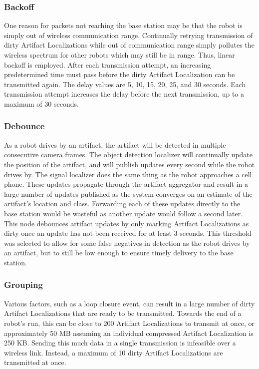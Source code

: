 \subsubsection{Backoff}
One reason for packets not reaching the base station may be that the robot is simply out of wireless communication range. Continually retrying transmission of dirty Artifact Localizations while out of communication range simply pollutes the wireless spectrum for other robots which may still be in range. Thus, linear backoff is employed. After each transmission attempt, an increasing predetermined time must pass before the dirty Artifact Localization can be transmitted again. The delay values are 5, 10, 15, 20, 25, and 30 seconds. Each transmission attempt increases the delay before the next transmission, up to a maximum of 30 seconds.
	
\subsubsection{Debounce}
As a robot drives by an artifact, the artifact will be detected in multiple consecutive camera frames. The object detection localizer will continually update the position of the artifact, and will publish updates every second while the robot drives by. The signal localizer does the same thing as the robot approaches a cell phone. These updates propagate through the artifact aggregator and result in a large number of updates published as the system converges on an estimate of the artifact's location and class. Forwarding each of these updates directly to the base station would be wasteful as another update would follow a second later. This node debounces artifact updates by only marking Artifact Localizations as dirty once an update has not been received for at least 3 seconds. This threshold was selected to allow for some false negatives in detection as the robot drives by an artifact, but to still be low enough to ensure timely delivery to the base station.
	
\subsubsection{Grouping}
Various factors, such as a loop closure event, can result in a large number of dirty Artifact Localizations that are ready to be transmitted. Towards the end of a robot's run, this can be close to 200 Artifact Localizations to transmit at once, or approximately 50 MB assuming an individual compressed Artifact Localization is 250 KB. Sending this much data in a single transmission is infeasible over a wireless link. Instead, a maximum of 10 dirty Artifact Localizations are transmitted at once.
	
